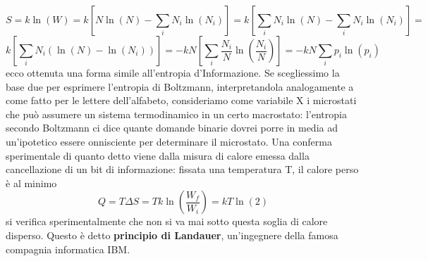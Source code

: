 \documentclass[
10pt, %
a4paper, %
oneside, %
headinclude,footinclude, %
BCOR5mm, %
]{scrartcl}
\begin{document}
\[S = k\ln(W)=k[N\ln(N)-\sum_iN_i\ln(N_i)]=k\left[\sum_iN_i\ln(N)-\sum_iN_i\ln(N_i)\right]=\]
\[k\left[\sum_iN_i\left(\ln(N)-\ln(N_i)\right)\right]=-kN\left[\sum_i\frac{N_i}{N}\ln\left(\frac{N_i}{N}\right)\right] =-kN\sum_ip_i\ln(p_i)\]
ecco ottenuta una forma simile all'entropia d'Informazione. Se scegliessimo la base due per esprimere l'entropia di Boltzmann, interpretandola analogamente a come fatto per le lettere dell'alfabeto, consideriamo come variabile X i microstati che può assumere un sistema termodinamico in un certo macrostato: l'entropia secondo Boltzmann ci dice quante domande binarie dovrei porre in media ad un'ipotetico essere onnisciente per determinare il microstato. Una conferma sperimentale di quanto detto viene dalla misura di calore emessa dalla cancellazione di un bit di informazione: fissata una temperatura T, il calore perso è al minimo 
\[Q=T\Delta S=Tk\ln\left(\frac{W_f}{W_i}\right)=kT\ln(2)  \]
si verifica sperimentalmente che non si va mai sotto questa soglia di calore disperso. Questo è detto \textbf{principio di Landauer}, un'ingegnere della famosa compagnia informatica IBM.
\newpage
\appendix
\end{document}
